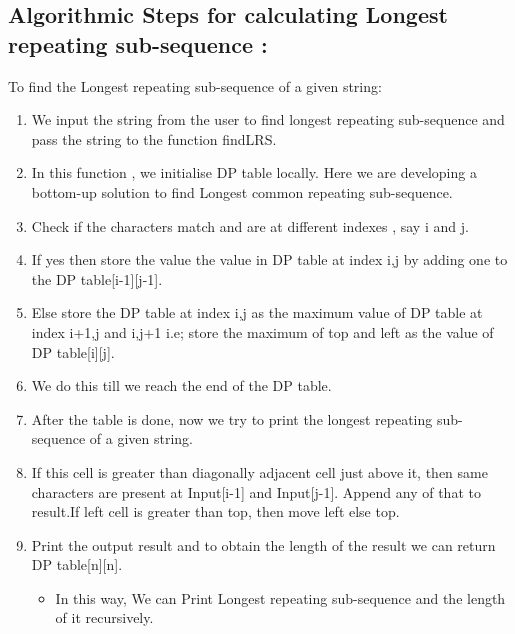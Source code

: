 \documentclass[conference]{IEEEtran}
\begin{document}
\subsection{Algorithmic Steps for calculating Longest repeating sub-sequence :}\label{AA}
To find the Longest repeating sub-sequence of a given string: 

\begin{enumerate}
\item We input the string from the user to find longest repeating sub-sequence and  pass the string to the function findLRS.
\item In this function , we initialise DP table locally. Here we are developing a bottom-up solution to find Longest common repeating sub-sequence.
\item Check if the characters match and are at different indexes , say i and j.
\item If yes then store the value the value in DP table at index i,j by adding one to the DP table[i-1][j-1].
\item Else store the DP table at index i,j as the maximum value of DP table at index i+1,j and i,j+1 i.e; store the maximum of top and left as the value of DP table[i][j].
\item We do this till we reach the end of the DP table.
\item After the table is done, now we try to print the longest repeating sub-sequence of a given string.
\item If this cell is greater than diagonally adjacent cell just above it, then same characters are present at Input[i-1] and Input[j-1]. Append any of that to result.If left cell is greater than top, then move left else top.
 \item Print the output result and to obtain the length of the result we can return DP table[n][n]. 
\begin{itemize}
\item In this way, We can Print Longest repeating sub-sequence and the length of it recursively.
\end{itemize}
\end{enumerate}
\end{document}
